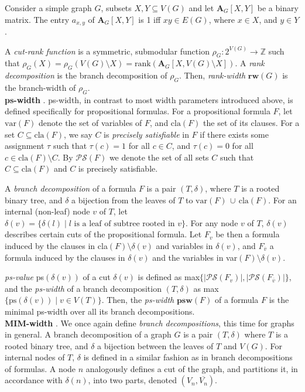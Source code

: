 Consider a simple graph $G$, subsets $X,Y \subseteq V(G)$ and let $\mathbf{A}_G[X,Y]$ be a binary matrix.
The entry $a_{x,y}$ of $\mathbf{A}_G[X,Y]$ is 1 iff $xy \in E(G)$, where $x\in X$, and $y\in Y$.

A {\em cut-rank function} is a symmetric, submodular function $\rho_G : 2^{V(G)} \rightarrow \mathbb{Z}$ such that $\rho_G(X)=\rho_G(V(G)\setminus X) = \text{rank}(\mathbf{A}_G[X, V(G)\setminus X])$.
A {\em rank decomposition} is the branch decomposition of $\rho_G$.
Then, {\em rank-width} $\textbf{rw}(G)$ is the branch-width of $\rho_G$. \\


\noindent
\textbf{ps-width} \cite{DBLP:conf/sat/SaetherTV14}.
ps-width, in contrast to most width parameters introduced above, is defined specifically for propositional formulas.
For a propositional formula $F$, let $\text{var}(F)$ denote the set of variables of $F$, and $\text{cla}(F)$ the set of its clauses.
For a set $C \subseteq \text{cla}(F)$, we say $C$ is {\em precisely satisfiable} in $F$ if there exists some assignment $\tau$ such that $\tau(c)=1$ for all $c\in C$, and $\tau(c)=0$ for all $c \in \text{cla}(F)\setminus C$.
By $\mathcal{PS}(F)$ we denote the set of all sets $C$ such that $C \subseteq \text{cla}(F)$ and $C$ is precisely satisfiable.


A {\em branch decomposition} of a formula $F$ is a pair $(T, \delta)$, where $T$ is a rooted binary tree, and $\delta$ a bijection from the leaves of $T$ to $\text{var}(F) \, \cup \, \text{cla}(F)$.
For an internal (non-leaf) node $v$ of $T$, let $\delta(v) = \{ \delta(l) \; | \; l \text{ is a leaf of subtree rooted in } v \}$.
For any node $v$ of $T$, $\delta(v)$ describes certain cuts of the propositional formula.
Let $F_v$ be then a formula induced by the clauses in cla$(F)\setminus \delta(v)$ and variables in $\delta(v)$, and $F_{\overline{v}}$ a formula induced by the clauses in $\delta(v)$ and the variables in var$(F)\setminus \delta(v)$.

{\em ps-value} ps$(\delta(v))$ of a cut $\delta(v)$ is defined as max$\{|\mathcal{PS}(F_v)|, |\mathcal{PS}(F_{\overline{v}})|\}$, and the {\em ps-width} of a branch decomposition $(T,\delta)$ as max$\{ \text{ps}(\delta(v)) \; | \; v \in V(T) \}$. 
Then, the {\em ps-width} $\mathbf{psw}(F)$ of a formula $F$ is the minimal ps-width over all its branch decompositions.\\

\noindent
\textbf{MIM-width} \cite{DBLP:conf/sat/SaetherTV14, PhD:Vatshelle}.
We once again define {\em branch decompositions}, this time for graphs in general.
A branch decomposition of a graph $G$ is a pair $(T, \delta)$ where $T$ is a rooted binary tree, and $\delta$ a bijection between the leaves of $T$ and $V(G).$
For internal nodes of $T$, $\delta$ is defined in a similar fashion as in branch decompositions of formulas.
A node $n$ analogously defines a cut of the graph, and partitions it, in accordance with $\delta(n)$, into two parts, denoted $(V_n, \overline{V_n})$.

